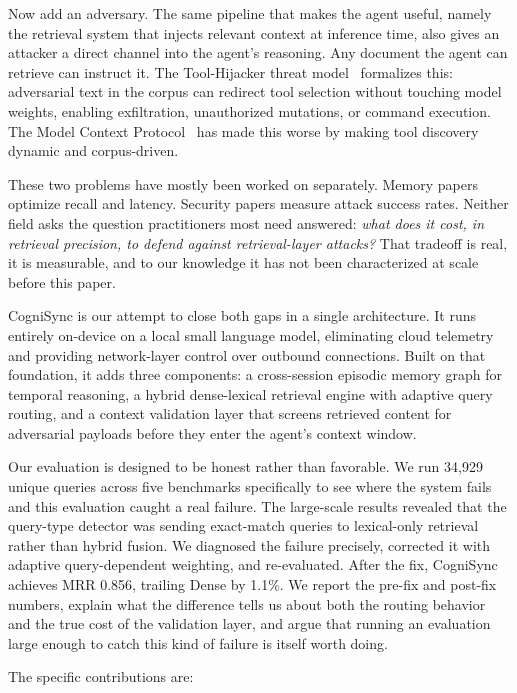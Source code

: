 \documentclass[sigconf,authordraft]{acmart}
\begin{document}
Now add an adversary. The same pipeline that makes the agent useful,
namely the retrieval system that injects relevant context at inference
time, also gives an attacker a direct channel into the agent's
reasoning. Any document the agent can retrieve can instruct it. The
Tool-Hijacker threat model~\cite{hui2024toolhijacker} formalizes this:
adversarial text in the corpus can redirect tool selection without
touching model weights, enabling exfiltration, unauthorized mutations,
or command execution. The Model Context Protocol~\cite{chen2025mcp} has
made this worse by making tool discovery dynamic and corpus-driven.

These two problems have mostly been worked on separately. Memory papers
optimize recall and latency. Security papers measure attack success
rates. Neither field asks the question practitioners most need answered:
\emph{what does it cost, in retrieval precision, to defend against
retrieval-layer attacks?} That tradeoff is real, it is measurable, and
to our knowledge it has not been characterized at scale before this
paper.

CogniSync is our attempt to close both gaps in a single architecture. It
runs entirely on-device on a local small language model, eliminating
cloud telemetry and providing network-layer control over outbound
connections. Built on that foundation, it adds three components: a
cross-session episodic memory graph for temporal reasoning, a hybrid
dense-lexical retrieval engine with adaptive query routing, and a
context validation layer that screens retrieved content for adversarial
payloads before they enter the agent's context window.

Our evaluation is designed to be honest rather than favorable. We run
34,929 unique queries across five benchmarks specifically to see where the
system fails and this evaluation caught a real failure. The
large-scale results revealed that the query-type detector was sending
exact-match queries to lexical-only retrieval rather than hybrid fusion.
We diagnosed the failure precisely, corrected it with adaptive
query-dependent weighting, and re-evaluated. After the fix, CogniSync
achieves MRR 0.856, trailing Dense by 1.1\%. We report the pre-fix and
post-fix numbers, explain what the difference tells us about both the
routing behavior and the true cost of the validation layer, and argue
that running an evaluation large enough to catch this kind of failure is
itself worth doing.

The specific contributions are:
\end{document}

